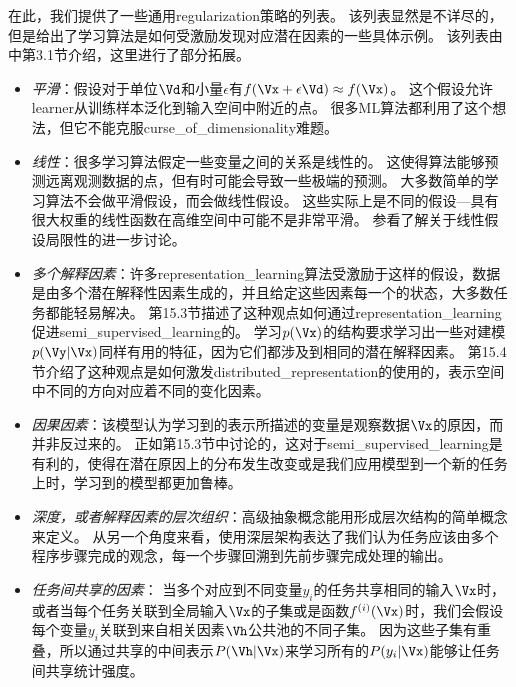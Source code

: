 在此，我们提供了一些通用\gls{regularization}策略的列表。
该列表显然是不详尽的，但是给出了学习算法是如何受激励发现对应潜在因素的一些具体示例。
该列表由\cite{Bengio-Courville-Vincent-TPAMI-2012}中第3.1节介绍，这里进行了部分拓展。
\begin{itemize}
	\item \emph{平滑}：假设对于单位$\Vd$和小量$\epsilon$有$f(\Vx + \epsilon \Vd) \approx f(\Vx)$。
	这个假设允许\gls{learner}从训练样本泛化到输入空间中附近的点。
	很多\gls{ML}算法都利用了这个想法，但它不能克服\gls{curse_of_dimensionality}难题。


	\item \emph{线性}：很多学习算法假定一些变量之间的关系是线性的。
	这使得算法能够预测远离观测数据的点，但有时可能会导致一些极端的预测。
	大多数简单的学习算法不会做平滑假设，而会做线性假设。
	这些实际上是不同的假设---具有很大权重的线性函数在高维空间中可能不是非常平滑。
	参看\cite{Goodfellow-2015-adversarial}了解关于线性假设局限性的进一步讨论。


	\item \emph{多个解释因素}：许多\gls{representation_learning}算法受激励于这样的假设，数据是由多个潜在解释性因素生成的，并且给定这些因素每一个的状态，大多数任务都能轻易解决。
	第15.3节描述了这种观点如何通过\gls{representation_learning}促进\gls{semi_supervised_learning}的。
	学习$p(\Vx)$的结构要求学习出一些对建模$p(\Vy|\Vx)$同样有用的特征，因为它们都涉及到相同的潜在解释因素。
	第15.4节介绍了这种观点是如何激发\gls{distributed_representation}的使用的，表示空间中不同的方向对应着不同的变化因素。


	\item \emph{因果因素}：该模型认为学习到的表示所描述的变量是观察数据$\Vx$的原因，而并非反过来的。
	正如第15.3节中讨论的，这对于\gls{semi_supervised_learning}是有利的，使得在潜在原因上的分布发生改变或是我们应用模型到一个新的任务上时，学习到的模型都更加鲁棒。


	\item \emph{深度，或者解释因素的层次组织}：高级抽象概念能用形成层次结构的简单概念来定义。
	从另一个角度来看，使用深层架构表达了我们认为任务应该由多个程序步骤完成的观念，每一个步骤回溯到先前步骤完成处理的输出。


	\item \emph{任务间共享的因素}：
	当多个对应到不同变量$y_i$的任务共享相同的输入$\Vx$时，或者当每个任务关联到全局输入$\Vx$的子集或是函数$f^{(i)}(\Vx)$时，我们会假设每个变量$y_i$关联到来自相关因素$\Vh$公共池的不同子集。
	因为这些子集有重叠，所以通过共享的中间表示$ P(\Vh | \Vx)$来学习所有的$P(y_i | \Vx)$能够让任务间共享统计强度。



\end{itemize}
